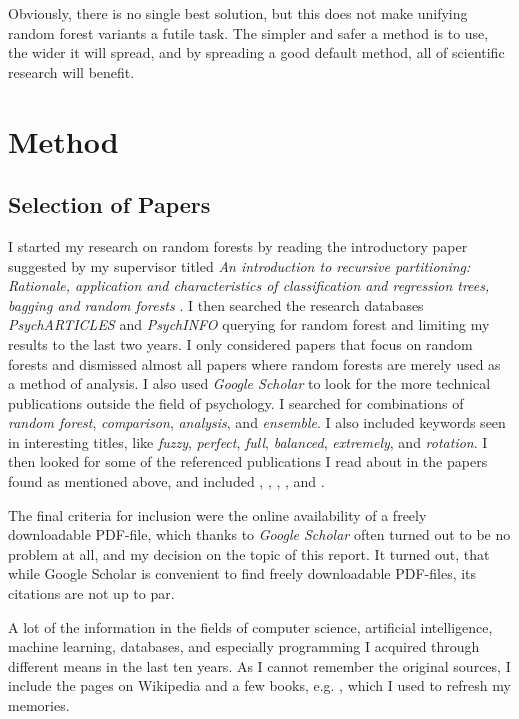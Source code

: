 \documentclass[a4paper,man,12pt,apacite,floatsintext,draftfirst]{apa6} %
\begin{document}
Obviously, there is no single best solution, but this does not make unifying
random forest variants a futile task.
The simpler and safer a method is to use, the wider it will spread, and by
spreading a good default method, all of scientific research will benefit.

\newpage
\section{Method}
\subsection{Selection of Papers}
I started my research on random forests by reading the
introductory paper suggested by my supervisor titled
\emph{An introduction to recursive partitioning: Rationale, application
and characteristics of classification and regression trees, bagging and
random forests} \cite{strobl2009introduction}.
I then searched the research databases \emph{PsychARTICLES} and
\emph{PsychINFO} querying for random forest and limiting my results
to the last two years.
I only considered papers that focus on random forests and
dismissed almost all papers where random forests are merely used as a
method of analysis.
I also used \emph{Google Scholar} to look for the more technical
publications outside the field of psychology.
I searched for combinations of \emph{random forest}, \emph{comparison},
\emph{analysis}, and \emph{ensemble}.
I also included keywords seen in interesting titles, like \emph{fuzzy},
\emph{perfect}, \emph{full}, \emph{balanced}, \emph{extremely}, and
\emph{rotation}.
I then looked for some of the referenced publications I read about in the
papers found as mentioned above, and included ,
, , ,
and .

The final criteria for inclusion were the online availability of a freely
downloadable PDF-file, which thanks to \emph{Google Scholar} often turned
out to be no problem at all, and my decision on the topic of
this report.
It turned out, that while Google Scholar is convenient to find freely
downloadable PDF-files, its citations are not up to par.

A lot of the information in the fields of computer science, artificial
intelligence, machine learning, databases, and especially programming
I acquired through different means in the last ten years.
As I cannot remember the original sources, I include the pages
on Wikipedia and a few books, e.g. ,
which I used to refresh my memories.
\end{document}
